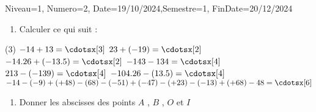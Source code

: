\documentclass[a4paper,12pt]{article}
\begin{document}
\begin{Maquette}[DM]{Niveau=1, Numero=2, Date=19/10/2024,Semestre=1, FinDate=20/12/2024}
\begin{exercice}
\end{exercice}
\begin{exercice}
\begin{enumerate}
\item Calculer ce qui suit : 
\end{enumerate}

\begin{tasks}(3)
  \task $-14+13=\cdotsx[3]$
  \task $23+(-19)=\cdotsx[2]$
  \task $	-14.26+(-13.5)=\cdotsx[2]$
  \task $-143-134=\cdotsx[4]$
  \task $	213-(-139)=\cdotsx[4]$
  \task $	-104.26-(13.5)=\cdotsx[4]$
  \task* $-14-(-9)+(+48)-(68)-(-51)+(-47)-(+23)-(-13)+(+68)-48= \cdotsx[6]$
\end{tasks}

\end{exercice}

\begin{exercice}
\begin{enumerate}
\item Donner les abscisses des points $A$ , $B$ , $O$ et $I$ 
\end{enumerate}


\end{exercice}



\end{Maquette}
\end{document}
